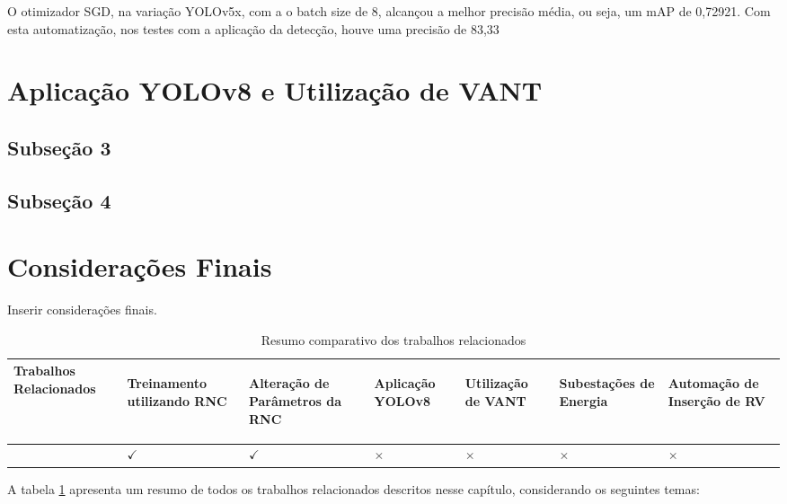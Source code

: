 O otimizador SGD, na variação YOLOv5x, com a o batch size de 8, alcançou a melhor precisão média, ou seja, um mAP de 0,72921. Com esta automatização, nos testes com a aplicação da detecção, houve uma precisão de 83,33%

\section{Aplicação YOLOv8 e Utilização de VANT}
\subsection{Subseção 3}

\subsection{Subseção 4}

\section{Considerações Finais}

Inserir considerações finais. 


\begin{table}[!hbt]
\centering
\caption{Resumo comparativo dos trabalhos relacionados}
\begin{tabular}{ >{\centering\arraybackslash}m{5cm} | >{\centering\arraybackslash}m{1.5cm} | >{\centering\arraybackslash}m{2cm} | >{\centering\arraybackslash}m{2cm} | >{\centering\arraybackslash}m{1.5cm} | >{\centering\arraybackslash}m{1.5cm} | >{\centering\arraybackslash}m{2cm} }
\hline
\cellcolor[gray]{0.9} \textbf{Trabalhos Relacionados} & 
\cellcolor[gray]{0.9} \begin{sideways} \textbf{Treinamento utilizando RNC} \end{sideways} & 
\cellcolor[gray]{0.9} \begin{sideways} \textbf{Alteração de Parâmetros da RNC} \end{sideways} & 
\cellcolor[gray]{0.9} \begin{sideways} \textbf{Aplicação YOLOv8} \end{sideways} & 
\cellcolor[gray]{0.9} \begin{sideways} \textbf{Utilização de VANT} \end{sideways} & 
\cellcolor[gray]{0.9} \begin{sideways} \textbf{Subestações de Energia} \end{sideways} &
\cellcolor[gray]{0.9} \begin{sideways} \textbf{Automação de Inserção de RV} \end{sideways} \\
\hline 
\cite{gonzaga2023identificaccao} & \(\checkmark\) & \(\checkmark\) & \(\times\) & \(\times\) & \(\times\) & \(\times\) \\
\hline
\end{tabular}
\label{tab:relacionado1}
\end{table}
A tabela \ref{tab:relacionado1} apresenta um resumo de todos os trabalhos relacionados descritos nesse capítulo, considerando os seguintes temas:

